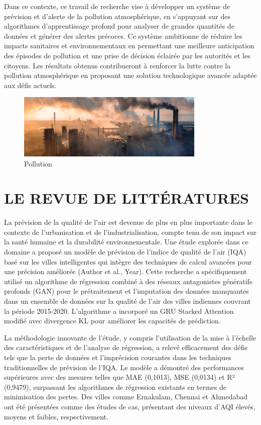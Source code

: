\documentclass[12pt,a4paper]{report}
\begin{document}
Dans ce contexte, ce travail de recherche vise à développer un système de prévision et d’alerte de la pollution atmosphérique, en s’appuyant sur des algorithmes d’apprentissage profond pour analyser de grandes quantités de données et générer des alertes précoces. Ce système ambitionne de réduire les impacts sanitaires et environnementaux en permettant une meilleure anticipation des épisodes de pollution et une prise de décision éclairée par les autorités et les citoyens. Les résultats obtenus contribueront à renforcer la lutte contre la pollution atmosphérique en proposant une solution technologique avancée adaptée aux défis actuels.

\begin{figure}[h]
    \centering
    \includegraphics[width=0.8\textwidth]{pollution.png}
    \caption{Pollution}
    \label{fig:Pollution}
\end{figure}

\chapter{LE REVUE DE LITTÉRATURES}
La prévision de la qualité de l'air est devenue de plus en plus importante dans le contexte de l'urbanisation et de l'industrialisation, compte tenu de son impact sur la santé humaine et la durabilité environnementale. Une étude explorée dans ce domaine a proposé un modèle de prévision de l'indice de qualité de l'air (IQA) basé sur les villes intelligentes qui intègre des techniques de calcul avancées pour une précision améliorée (Author et al., Year). Cette recherche a spécifiquement utilisé un algorithme de régression combiné à des réseaux antagonistes génératifs profonds (GAN) pour le prétraitement et l'imputation des données manquantes dans un ensemble de données sur la qualité de l'air des villes indiennes couvrant la période 2015-2020. L'algorithme a incorporé un GRU Stacked Attention modifié avec divergence KL pour améliorer les capacités de prédiction.

La méthodologie innovante de l'étude, y compris l'utilisation de la mise à l'échelle des caractéristiques et de l'analyse de régression, a relevé efficacement des défis tels que la perte de données et l'imprécision courantes dans les techniques traditionnelles de prévision de l'IQA. Le modèle a démontré des performances supérieures avec des mesures telles que MAE (0,1013), MSE (0,0134) et R² (0,9479), surpassant les algorithmes de régression existants en termes de minimisation des pertes. Des villes comme Ernakulam, Chennai et Ahmedabad ont été présentées comme des études de cas, présentant des niveaux d'AQI élevés, moyens et faibles, respectivement.
\end{document}
